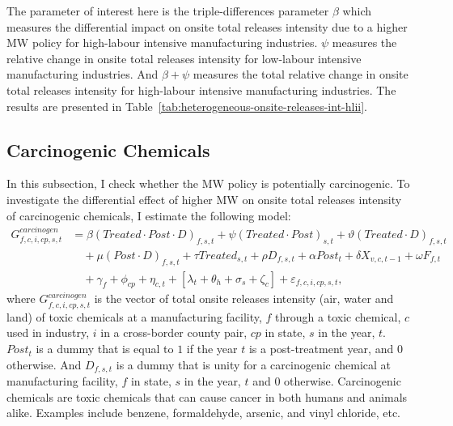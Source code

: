 \documentclass[12pt, english]{article}
\begin{document}
    The parameter of interest here is the triple-differences parameter $\beta$ which measures the differential impact on onsite total releases intensity due to a higher MW policy for high-labour intensive manufacturing industries. $\psi$ measures the relative change in onsite total releases intensity for low-labour intensive manufacturing industries. And $\beta + \psi$ measures the total relative change in onsite total releases intensity for high-labour intensive manufacturing industries. The results are presented in Table~\ref{tab:heterogeneous-onsite-releases-int-hlii}.
    

    \subsection{Carcinogenic Chemicals}\label{subsec:carcinogenic-chemicals}
    In this subsection, I check whether the MW policy is potentially carcinogenic. To investigate the differential effect of higher MW on onsite total releases intensity of carcinogenic chemicals, I estimate the following model:
    \begin{align}
        G_{f,c,i,cp,s,t}^{carcinogen} &= \beta (Treated \cdot Post \cdot D)_{f,s,t} + \psi (Treated \cdot Post)_{s,t} + \vartheta (Treated \cdot D)_{f,s,t} \nonumber \\
        &\quad + \mu (Post \cdot D)_{f,s,t} + \tau Treated_{s,t} + \rho D_{f,s,t} + \alpha Post_{t} + \delta X_{v,c,t-1} + \omega F_{f,t} \nonumber \\
        &\quad + \gamma_{f} + \phi_{cp} + \eta_{c,t} + \left[\lambda_{t} + \theta_{h} + \sigma_{s} + \zeta_{c} \right] + \varepsilon_{f,c,i,cp,s,t},\label{eq:heterogeneous-onsite-releases-intensity-carcinogens}
    \end{align}
    where $G_{f,c,i,cp,s,t}^{carcinogen}$ is the vector of total onsite releases intensity (air, water and land) of toxic chemicals at a manufacturing facility, $f$ through a toxic chemical, $c$ used in industry, $i$ in a cross-border county pair, $cp$ in state, $s$ in the year, $t$. $Post_{t}$ is a dummy that is equal to $1$ if the year $t$ is a post-treatment year, and $0$ otherwise. And $D_{f,s,t}$ is a dummy that is unity for a carcinogenic chemical at manufacturing facility, $f$ in state, $s$ in the year, $t$ and $0$ otherwise. Carcinogenic chemicals are toxic chemicals that can cause cancer in both humans and animals alike. Examples include benzene, formaldehyde, arsenic, and vinyl chloride, etc.
    
\end{document}
